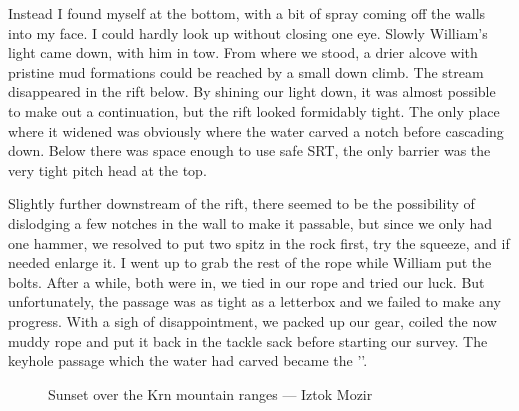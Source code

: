 Instead I found myself at the bottom, with a bit of spray coming off the walls into my face. I could hardly look up without closing one eye. Slowly William's light came down, with him in tow. From where we stood, a drier alcove with pristine mud formations could be reached by a small down climb. The stream disappeared in the rift below. By shining our light down, it was almost possible to make out a continuation, but the rift looked formidably tight. The only place where it widened was obviously where the water carved a notch before cascading down. Below there was space enough to use safe SRT, the only barrier was the very tight pitch head at the top.

Slightly further downstream of the rift, there seemed to be the possibility of dislodging a few notches in the wall to make it passable, but since we only had one hammer, we resolved to put two spitz in the rock first, try the squeeze, and if needed enlarge it. I went up to grab the rest of the rope while William put the bolts. After a while, both were in, we tied in our rope and tried our luck. But unfortunately, the passage was as tight as a letterbox and we failed to make any progress. With a sigh of disappointment, we packed up our gear, coiled the now muddy rope and put it back in the tackle sack before starting our survey. The keyhole passage which the water had carved became the ''.

\begin{figure}[b!]
\centering
{}
\caption{Sunset over the Krn mountain ranges --- Iztok Mozir}
\label{SS2014}
\end{figure}